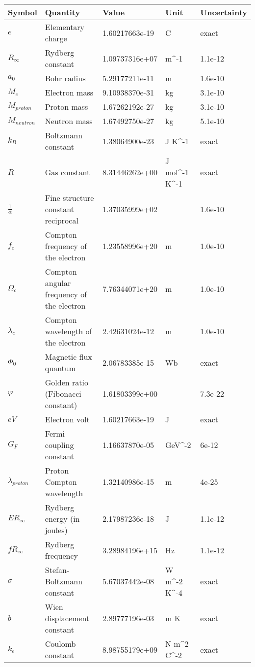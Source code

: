 \documentclass[a4paper, aps,preprint,superscriptaddress, 12pt]{revtex4}
\begin{document}
\begin{table}[H]
    \centering
    \footnotesize
    \renewcommand{\arraystretch}{1.3}
    \begin{tabular}{|l|l|l|l|l|}
        \hline
        \textbf{Symbol} & \textbf{Quantity} & \textbf{Value} & \textbf{Unit} & \textbf{Uncertainty} \\
        \hline
        $e$ & Elementary charge & 1.60217663e-19 & C & exact \\ \hline%
        $R_\infty$ & Rydberg constant & 1.09737316e+07 & m^-1 & 1.1e-12 \\ \hline%
        $a_0$ & Bohr radius & 5.29177211e-11 & m & 1.6e-10 \\ \hline%
        $M_e$ & Electron mass & 9.10938370e-31 & kg & 3.1e-10 \\ \hline%
        $M_{proton}$ & Proton mass & 1.67262192e-27 & kg & 3.1e-10 \\ \hline%
        $M_{neutron}$ & Neutron mass & 1.67492750e-27 & kg & 5.1e-10 \\ \hline%
        $k_B$ & Boltzmann constant & 1.38064900e-23 & J K^-1 & exact \\ \hline%
        $R$ & Gas constant & 8.31446262e+00 & J mol^-1 K^-1 & exact \\ \hline%
        $\frac{1}{\alpha}$ & Fine structure constant reciprocal & 1.37035999e+02 &  & 1.6e-10 \\ \hline%
        $f_c$ & Compton frequency of the electron & 1.23558996e+20 & m & 1.0e-10 \\ \hline%
        $\Omega_c$ & Compton angular frequency of the electron & 7.76344071e+20 & m & 1.0e-10 \\ \hline%
        $\lambda_c$ & Compton wavelength of the electron & 2.42631024e-12 & m & 1.0e-10 \\ \hline%
        $\Phi_0$ & Magnetic flux quantum & 2.06783385e-15 & Wb & exact \\ \hline%
        $\varphi$ & Golden ratio (Fibonacci constant) & 1.61803399e+00 &  & 7.3e-22 \\ \hline%
        $eV$ & Electron volt & 1.60217663e-19 & J & exact \\ \hline%
        $G_F$ & Fermi coupling constant & 1.16637870e-05 & GeV^-2 & 6e-12 \\ \hline%
        $\lambda_{proton}$ & Proton Compton wavelength & 1.32140986e-15 & m & 4e-25 \\ \hline%

        $ER_\infty$ & Rydberg energy (in joules) & 2.17987236e-18 & J & 1.1e-12 \\ \hline%
        $fR_\infty$ & Rydberg frequency & 3.28984196e+15 & Hz & 1.1e-12 \\ \hline%
        $\sigma$ & Stefan-Boltzmann constant & 5.67037442e-08 & W m^-2 K^-4 & exact \\ \hline%
        $b$ & Wien displacement constant & 2.89777196e-03 & m K & exact \\ \hline%
        $k_e$ & Coulomb constant & 8.98755179e+09 & N m^2 C^-2 & exact \\ \hline%


\end{tabular}
\end{table}
\end{document}
